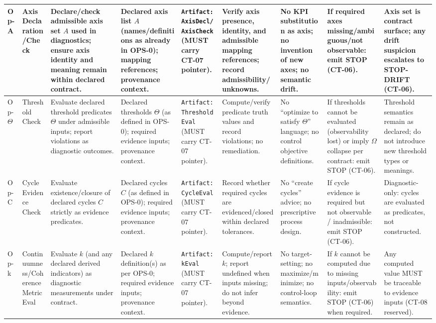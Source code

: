 \begin{longtable}{|p{1.7cm}|p{2.2cm}|p{3.0cm}|p{3.0cm}|p{3.2cm}|p{3.0cm}|p{3.0cm}|p{3.0cm}|p{2.6cm}|}
Op-A &
Axis Declaration/Check &
Declare/check admissible axis set $A$ used in diagnostics; ensure axis identity and meaning remain within declared contract. &
Declared axis list $A$ (names/definitions as already in OPS-0); mapping references; provenance context. &
\texttt{Artifact:AxisDecl/AxisCheck} (MUST carry CT-07 pointer). &
Verify axis presence, identity, and admissible mapping references; record admissibility/unknowns. &
No KPI substitution as axis; no invention of new axes; no semantic drift. &
If required axes missing/ambiguous/not observable: emit STOP (CT-06). &
Axis set is contract surface; any drift suspicion escalates to STOP-DRIFT (CT-06). \\
\hline

Op-$\Theta$ &
Threshold Check &
Evaluate declared threshold predicates $\Theta$ under admissible inputs; report violations as diagnostic outcomes. &
Declared thresholds $\Theta$ (as defined in OPS-0); required evidence inputs; provenance context. &
\texttt{Artifact:ThresholdEval} (MUST carry CT-07 pointer). &
Compute/verify predicate truth values and record violations; no remediation. &
No ``optimize to satisfy $\Theta$'' language; no control objective definitions. &
If thresholds cannot be evaluated (observability lost) or imply $\Omega$ collapse per contract: emit STOP (CT-06). &
Threshold semantics remain as declared; do not introduce new threshold types or meanings. \\
\hline

Op-C &
Cycle Evidence Check &
Evaluate existence/closure of declared cycles $C$ strictly as evidence predicates. &
Declared cycles $C$ (as defined in OPS-0); required evidence inputs; provenance context. &
\texttt{Artifact:CycleEval} (MUST carry CT-07 pointer). &
Record whether required cycles are evidenced/closed within declared tolerances. &
No ``create cycles'' advice; no prescriptive process design. &
If cycle evidence is required but not observable / inadmissible: emit STOP (CT-06). &
Diagnostic-only: cycles are evaluated as predicates, not constructed. \\
\hline

Op-k &
Continuumness/Coherence Metric Eval &
Evaluate $k$ (and any declared derived indicators) as diagnostic measurements under contract. &
Declared $k$ definition(s) as per OPS-0; required evidence inputs; provenance context. &
\texttt{Artifact:kEval} (MUST carry CT-07 pointer). &
Compute/report $k$; report undefined when inputs missing; do not infer beyond evidence. &
No target-setting; no maximize/minimize; no control-loop semantics. &
If $k$ cannot be computed due to missing inputs/observability: emit STOP (CT-06) when required. &
Any computed value MUST be traceable to evidence inputs (CT-08 reserved). \\
\hline


\end{longtable}
